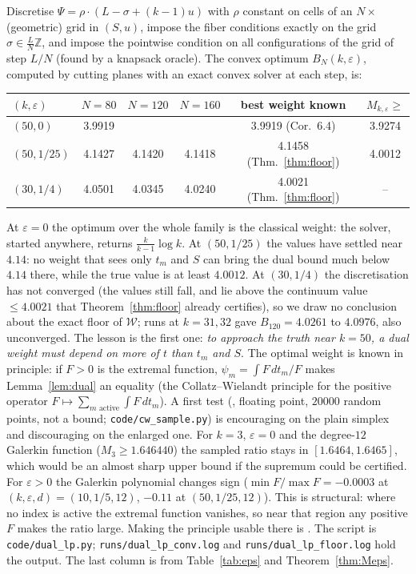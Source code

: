 \begin{proposition}\label{prop:family}
Discretise $\Psi=\rho\cdot(L-\sigma+(k-1)u)$ with $\rho$ constant on cells of
an $N\times{}$(geometric) grid in $(S,u)$, impose the fiber conditions exactly
on the grid $\sigma\in\frac LN\mathbb Z$, and impose the pointwise condition
on all configurations of the grid of step $L/N$ (found by a knapsack oracle).
The convex optimum $B_N(k,\varepsilon)$, computed by cutting planes with an
exact convex solver at each step, is:
\begin{center}
\begin{tabular}{@{}lccccc@{}}
\toprule
$(k,\varepsilon)$ & $N=80$ & $N=120$ & $N=160$ & best weight known & $M_{k,\varepsilon}\ge$\\
\midrule
$(50,0)$    & 3.9919 & & & 3.9919 (Cor.~6.4) & 3.9274\\
$(50,1/25)$ & 4.1427 & 4.1420 & 4.1418 & 4.1458 (Thm.~\ref{thm:floor}) & 4.0012\\
$(30,1/4)$  & 4.0501 & 4.0345 & 4.0240 & 4.0021 (Thm.~\ref{thm:floor}) & --\\
\bottomrule
\end{tabular}
\end{center}
\end{proposition}

At $\varepsilon=0$ the optimum over the whole family is the classical weight:
the solver, started anywhere, returns $\frac{k}{k-1}\log k$. At
$(50,1/25)$ the values have settled near $4.14$: no weight that sees only
$t_m$ and $S$ can bring the dual bound much below $4.14$ there, while the true
value is at least $4.0012$. At $(30,1/4)$ the discretisation has not
converged (the values still fall, and lie above the continuum value $\le4.0021$
that Theorem~\ref{thm:floor} already certifies), so we draw no conclusion about
the exact floor of $\mathcal W$; runs at $k=31,32$ gave $B_{120}=4.0261$ to
$4.0976$, also unconverged. The lesson is the first one: \emph{to approach the
truth near $k=50$, a dual weight must depend on more of $t$ than $t_m$ and
$S$}. The optimal weight is known in principle: if $F>0$ is the extremal
function, $\psi_m=\int F\,dt_m/F$ makes Lemma~\ref{lem:dual} an equality (the
Collatz--Wielandt principle for the positive operator
$F\mapsto\sum_{m\text{ active}}\int F\,dt_m$). A first test
(, floating point, $20000$ random points, not a bound;
\texttt{code/cw\_sample.py}) is encouraging on the plain simplex and
discouraging on the enlarged one. For $k=3$, $\varepsilon=0$ and the
degree-$12$ Galerkin function ($M_3\ge1.646440$) the sampled ratio stays in
$[1.6464,1.6465]$, which would be an almost sharp upper bound if the supremum
could be certified. For $\varepsilon>0$ the Galerkin polynomial changes sign
($\min F/\max F=-0.0003$ at $(k,\varepsilon,d)=(10,1/5,12)$, $-0.11$ at
$(50,1/25,12)$). This is structural: where no index is active the extremal
function vanishes, so near that region any positive $F$ makes the ratio
large. Making the principle usable there is . The script is \texttt{code/dual\_lp.py};
\texttt{runs/dual\_lp\_conv.log} and \texttt{runs/dual\_lp\_floor.log} hold the
output. The last column is from Table~\ref{tab:eps} and
Theorem~\ref{thm:Meps}.

